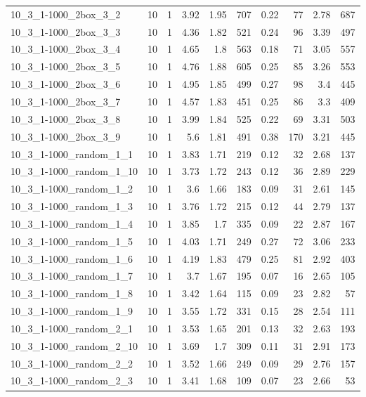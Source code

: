 \begin{center}
\begin{scriptsize}
\begin{longtable}{lrrrrrrrrr}
10\_3\_1-1000\_2box\_3\_2 & 10 & 1 & 3.92 & 1.95 & 707 & 0.22 & 77 & 2.78 & 687\\
10\_3\_1-1000\_2box\_3\_3 & 10 & 1 & 4.36 & 1.82 & 521 & 0.24 & 96 & 3.39 & 497\\
10\_3\_1-1000\_2box\_3\_4 & 10 & 1 & 4.65 & 1.8 & 563 & 0.18 & 71 & 3.05 & 557\\
10\_3\_1-1000\_2box\_3\_5 & 10 & 1 & 4.76 & 1.88 & 605 & 0.25 & 85 & 3.26 & 553\\
10\_3\_1-1000\_2box\_3\_6 & 10 & 1 & 4.95 & 1.85 & 499 & 0.27 & 98 & 3.4 & 445\\
10\_3\_1-1000\_2box\_3\_7 & 10 & 1 & 4.57 & 1.83 & 451 & 0.25 & 86 & 3.3 & 409\\
10\_3\_1-1000\_2box\_3\_8 & 10 & 1 & 3.99 & 1.84 & 525 & 0.22 & 69 & 3.31 & 503\\
10\_3\_1-1000\_2box\_3\_9 & 10 & 1 & 5.6 & 1.81 & 491 & 0.38 & 170 & 3.21 & 445\\
10\_3\_1-1000\_random\_1\_1 & 10 & 1 & 3.83 & 1.71 & 219 & 0.12 & 32 & 2.68 & 137\\
10\_3\_1-1000\_random\_1\_10 & 10 & 1 & 3.73 & 1.72 & 243 & 0.12 & 36 & 2.89 & 229\\
10\_3\_1-1000\_random\_1\_2 & 10 & 1 & 3.6 & 1.66 & 183 & 0.09 & 31 & 2.61 & 145\\
10\_3\_1-1000\_random\_1\_3 & 10 & 1 & 3.76 & 1.72 & 215 & 0.12 & 44 & 2.79 & 137\\
10\_3\_1-1000\_random\_1\_4 & 10 & 1 & 3.85 & 1.7 & 335 & 0.09 & 22 & 2.87 & 167\\
10\_3\_1-1000\_random\_1\_5 & 10 & 1 & 4.03 & 1.71 & 249 & 0.27 & 72 & 3.06 & 233\\
10\_3\_1-1000\_random\_1\_6 & 10 & 1 & 4.19 & 1.83 & 479 & 0.25 & 81 & 2.92 & 403\\
10\_3\_1-1000\_random\_1\_7 & 10 & 1 & 3.7 & 1.67 & 195 & 0.07 & 16 & 2.65 & 105\\
10\_3\_1-1000\_random\_1\_8 & 10 & 1 & 3.42 & 1.64 & 115 & 0.09 & 23 & 2.82 & 57\\
10\_3\_1-1000\_random\_1\_9 & 10 & 1 & 3.55 & 1.72 & 331 & 0.15 & 28 & 2.54 & 111\\
10\_3\_1-1000\_random\_2\_1 & 10 & 1 & 3.53 & 1.65 & 201 & 0.13 & 32 & 2.63 & 193\\
10\_3\_1-1000\_random\_2\_10 & 10 & 1 & 3.69 & 1.7 & 309 & 0.11 & 31 & 2.91 & 173\\
10\_3\_1-1000\_random\_2\_2 & 10 & 1 & 3.52 & 1.66 & 249 & 0.09 & 29 & 2.76 & 157\\
10\_3\_1-1000\_random\_2\_3 & 10 & 1 & 3.41 & 1.68 & 109 & 0.07 & 23 & 2.66 & 53\\

\end{longtable}
\end{scriptsize}
\end{center}
